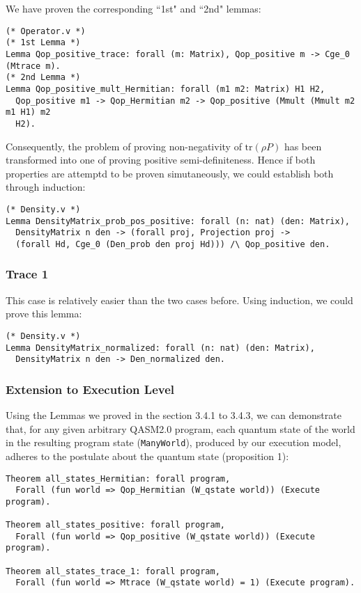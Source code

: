 \documentclass[10pt,a4paper]{article}
\newcommand{\<}{\langle}
\renewcommand{\>}{\rangle}
\newcommand{\tr}[1]{\textrm{tr} \left( #1 \right)}
\begin{document}
We have proven the corresponding ``1st" and ``2nd" lemmas:

\begin{lstlisting}
(* Operator.v *)
(* 1st Lemma *)
Lemma Qop_positive_trace: forall (m: Matrix), Qop_positive m -> Cge_0 (Mtrace m).
(* 2nd Lemma *)
Lemma Qop_positive_mult_Hermitian: forall (m1 m2: Matrix) H1 H2,
  Qop_positive m1 -> Qop_Hermitian m2 -> Qop_positive (Mmult (Mmult m2 m1 H1) m2
  H2).
\end{lstlisting}

Consequently, the problem of proving non-negativity of $\tr{\rho P}$ has been transformed into one of
proving positive semi-definiteness. Hence if both properties are attemptd to be
proven simutaneously, we could establish both through induction:

\begin{lstlisting}
(* Density.v *)
Lemma DensityMatrix_prob_pos_positive: forall (n: nat) (den: Matrix),
  DensityMatrix n den -> (forall proj, Projection proj ->
  (forall Hd, Cge_0 (Den_prob den proj Hd))) /\ Qop_positive den.
\end{lstlisting}


\subsubsection{Trace 1}
This case is relatively easier than the two cases before. Using induction, we
could prove this lemma:

\begin{lstlisting}
(* Density.v *)
Lemma DensityMatrix_normalized: forall (n: nat) (den: Matrix),
  DensityMatrix n den -> Den_normalized den.
\end{lstlisting}


\subsubsection{Extension to Execution Level}

Using the Lemmas we proved in the section 3.4.1 to 3.4.3, we can demonstrate that, for any
given arbitrary QASM2.0 program, each quantum state of the world in the
resulting program state (\texttt{ManyWorld}), produced by our
execution model, adheres to the postulate about the quantum state (proposition
1):

\begin{lstlisting}
Theorem all_states_Hermitian: forall program,
  Forall (fun world => Qop_Hermitian (W_qstate world)) (Execute program).

Theorem all_states_positive: forall program,
  Forall (fun world => Qop_positive (W_qstate world)) (Execute program).

Theorem all_states_trace_1: forall program,
  Forall (fun world => Mtrace (W_qstate world) = 1) (Execute program).
\end{lstlisting}
\end{document}
